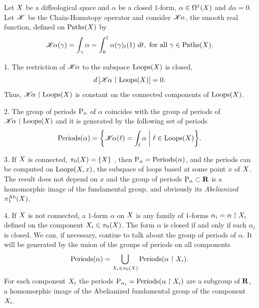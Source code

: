 \begin{article}
  \label{Periods-of-closed-1-forms}
  Let $X$ be a diffeological space and $\alpha$ be a closed $1$-form,
  $\alpha \in \Omega^1(X)$ and $d\alpha = 0$.
  Let $\mathscr{K}$ be the Chain-Homotopy operator  and consider $\mathscr{K}\!\alpha$,
  the smooth real function,
  defined on $\operatorname{Paths}(X)$ by
  $$%
  \CHK\!\alpha(\gamma) = \int_\gamma \alpha = \int_0^1 \alpha(\gamma)_t(1)\ dt, \text{ for all } \gamma \in \Paths(\X).
  $$%
  
  1. The restriction of $\mathscr{K}\!\alpha$ to the subspace $\operatorname{Loops}(X)$ is closed,
  $$%
  d\left[\CHK\!\alpha \restriction \Loops(\X)\right] = 0.
  $$%
  Thus, $\mathscr{K}\!\alpha \restriction \operatorname{Loops}(X)$ is
  constant on the connected components of
  $\operatorname{Loops}(X)$.
  
  2. The group of periods ${\operatorname{P}}_\alpha$ of $\alpha$  coincides with the group of periods of $\mathscr{K}\!\alpha \restriction \operatorname{Loops}(X)$ and it is generated by the following set of periods
  \begin{equation}
    \renewcommand{\theequation}{$\clubsuit$}
    \PeriodsOf(\alpha) = \bigg\{ \CHK\!\alpha(\ell) = \int_\ell \alpha \biggm\vert \ell \in \Loops(\X) \bigg\}.
  \end{equation}
  
  3. If $X$ is connected,
  $\pi_0(X) = \{X\}$ ,
  then ${\operatorname{P}}_\alpha = {\operatorname{Periods}}(\alpha)$,
  and the periods can be computed on $\operatorname{Loops}(X,x)$,
  the subspace of loops based at some point $x$ of $X$.
  The result does not depend on $x$ and the group of periods ${\operatorname{P}}_\alpha \subset {\mathbf R}$ is a homomorphic image of the fundamental group,
  and obviously its {\em Abelianized} $\pi_1^{\rm Ab}(X)$.
  
  4. If $X$ is not connected,
  a $1$-form $\alpha$ on $X$ is any family of $1$-forms $\alpha_i = \alpha \restriction X_i$ defined on the component $X_i \in \pi_0(X)$.
  The form $\alpha$ is closed if and only if each $\alpha_i$ is closed.
  We can,
  if necessary,
  contiue to talk about the group of periods of $\alpha$.
  It will be generated by the union of the groups of periods on all components
  $$%
  \PeriodsOf(\alpha) =
  \bigcup_{\X_i \in \pi_0(\X)} \PeriodsOf(\alpha\restriction \X_i).
  $$%
  For each component $X_i$ the periods ${\operatorname{P}}_{\alpha_i} = {\operatorname{Periods}}(\alpha \restriction X_i)$ are a subgroup of ${\mathbf R}$,
  a homomorphic image of the Abelianized fundamental group of the component $X_i$.
\end{article} %

